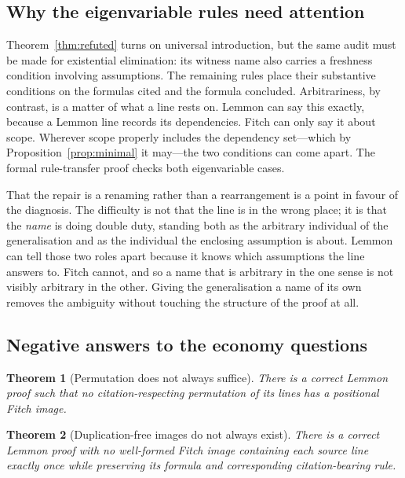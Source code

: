 \documentclass[11pt]{article}
\theoremstyle{plain}
\newtheorem{theorem}{Theorem}
\theoremstyle{definition}
\theoremstyle{remark}
\begin{document}
\subsection{Why the eigenvariable rules need attention}\label{sec:eigen}

Theorem~\ref{thm:refuted} turns on universal introduction, but the same audit
must be made for existential elimination: its witness name also carries a
freshness condition involving assumptions. The remaining rules place their
substantive conditions on the formulas cited and the formula concluded.
Arbitrariness, by contrast, is a matter of what a line rests on. Lemmon can
say this exactly, because a Lemmon line records its dependencies. Fitch can
only say it about scope. Wherever scope properly includes the dependency
set---which by Proposition~\ref{prop:minimal} it may---the two conditions can
come apart. The formal rule-transfer proof checks both eigenvariable cases.

That the repair is a renaming rather than a rearrangement is a point in
favour of the diagnosis. The difficulty is not that the line is in the wrong
place; it is that the \emph{name} is doing double duty, standing both as the
arbitrary individual of the generalisation and as the individual the enclosing
assumption is about. Lemmon can tell those two roles apart because it knows
which assumptions the line answers to. Fitch cannot, and so a name that is
arbitrary in the one sense is not visibly arbitrary in the other. Giving the
generalisation a name of its own removes the ambiguity without touching the
structure of the proof at all.

\subsection{Negative answers to the economy questions}

\begin{theorem}[Permutation does not always suffice]\label{conj:reorder}
There is a correct Lemmon proof such that no citation-respecting permutation
of its lines has a positional Fitch image.
\end{theorem}

\begin{theorem}[Duplication-free images do not always exist]
\label{conj:noduplication}
There is a correct Lemmon proof with no well-formed Fitch image containing
each source line exactly once while preserving its formula and corresponding
citation-bearing rule.
\end{theorem}
\end{document}
